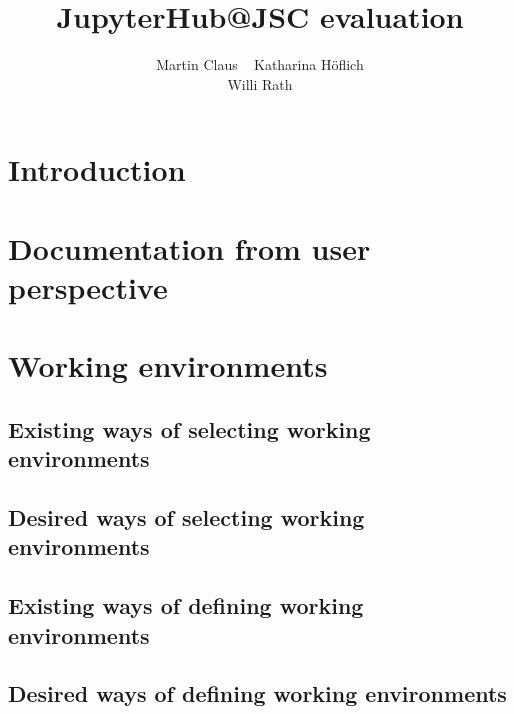 \documentclass[11pt,a4paper]{article}
\title{\textbf{JupyterHub@JSC evaluation}}
\author{
  Martin Claus \ %
	Katharina Höflich \\
	Willi Rath}
\begin{document}
\maketitle


\section{Introduction}
\label{s-introductoin}


\section{Documentation from user perspective}
\label{s-doc-from-user-pov}


\section{Working environments}
\label{s-working-envs}

\subsection{Existing ways of selecting working environments}
\label{ss-existing-env-selection}

\subsection{Desired ways of selecting working environments}
\label{ss-desired-env-selection}

\subsection{Existing ways of defining working environments}
\label{ss-existing-env-definition}

\subsection{Desired ways of defining working environments}
\label{ss-desired-env-definition}

\end{document}
